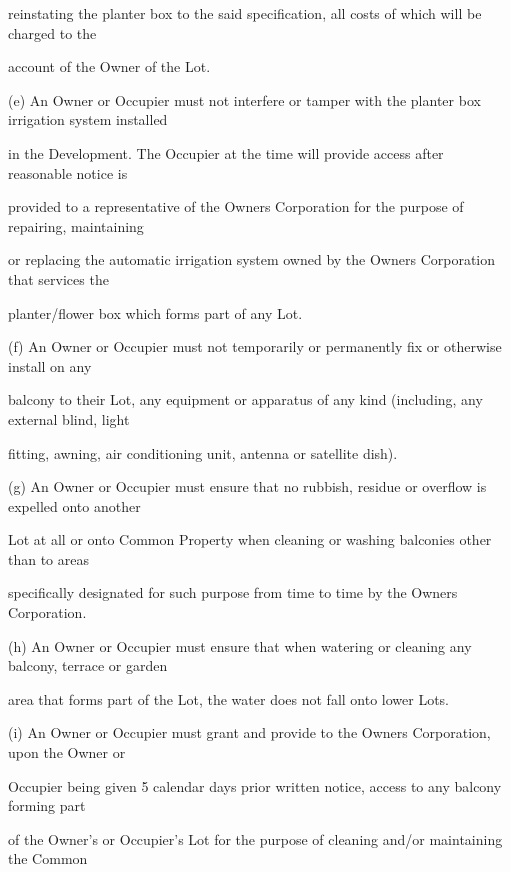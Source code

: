 \documentclass{article}
\begin{document}
{\fontsize{10.02}{1}reinstating the planter box to the said specification, all costs of which will be charged to the }

{\fontsize{10.02}{1}account of the Owner of the Lot. }

{\fontsize{9.962}{1}(e) An Owner or Occupier must not interfere or tamper with the planter box irrigation system installed }

{\fontsize{10.02}{1}in the Development. The Occupier at the time will provide access after reasonable notice is }

{\fontsize{10.02}{1}provided to a representative of the Owners Corporation for the purpose of repairing, maintaining }

{\fontsize{10.02}{1}or replacing the automatic irrigation system owned by the Owners Corporation that services the }

\newpage

{\fontsize{10.02}{1}planter/flower box which forms part of any Lot. }

{\fontsize{9.962}{1}(f) An Owner or Occupier must not temporarily or permanently fix or otherwise install on any }

{\fontsize{10.02}{1}balcony to their Lot, any equipment or apparatus of any kind (including, any external blind, light }

{\fontsize{10.02}{1}fitting, awning, air conditioning unit, antenna or satellite dish). }

{\fontsize{9.962}{1}(g) An Owner or Occupier must ensure that no rubbish, residue or overflow is expelled onto another }

{\fontsize{10.02}{1}Lot at all or onto Common Property when cleaning or washing balconies other than to areas }

{\fontsize{10.02}{1}specifically designated for such purpose from time to time by the Owners Corporation. }

{\fontsize{9.962}{1}(h) An Owner or Occupier must ensure that when watering or cleaning any balcony, terrace or garden }

{\fontsize{10.02}{1}area that forms part of the Lot, the water does not fall onto lower Lots. }

{\fontsize{9.962}{1}(i) An Owner or Occupier must grant and provide to the Owners Corporation, upon the Owner or }

{\fontsize{10.02}{1}Occupier being given 5 calendar days prior written notice, access to any balcony forming part }

{\fontsize{10.02}{1}of the Owner's or Occupier's Lot for the purpose of cleaning and/or maintaining the Common }
\end{document}
